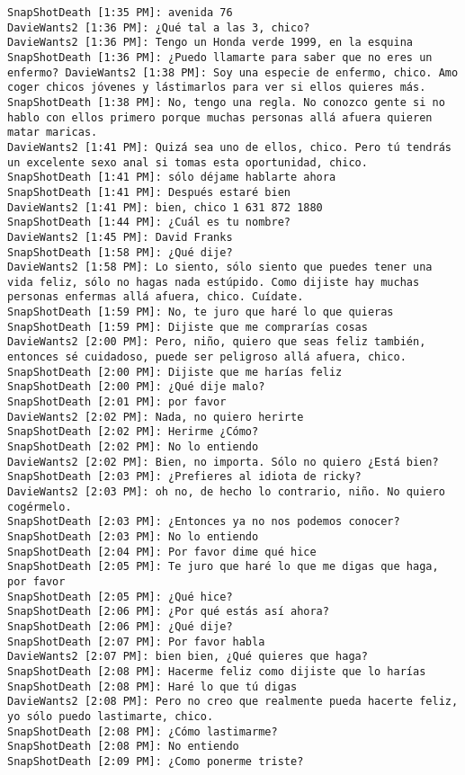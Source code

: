 \begin{verbatim}
SnapShotDeath [1:35 PM]: avenida 76
DavieWants2 [1:36 PM]: ¿Qué tal a las 3, chico? 
DavieWants2 [1:36 PM]: Tengo un Honda verde 1999, en la esquina 
SnapShotDeath [1:36 PM]: ¿Puedo llamarte para saber que no eres un enfermo? DavieWants2 [1:38 PM]: Soy una especie de enfermo, chico. Amo coger chicos jóvenes y lástimarlos para ver si ellos quieres más. 
SnapShotDeath [1:38 PM]: No, tengo una regla. No conozco gente si no hablo con ellos primero porque muchas personas allá afuera quieren matar maricas. 
DavieWants2 [1:41 PM]: Quizá sea uno de ellos, chico. Pero tú tendrás un excelente sexo anal si tomas esta oportunidad, chico. 
SnapShotDeath [1:41 PM]: sólo déjame hablarte ahora 
SnapShotDeath [1:41 PM]: Después estaré bien 
DavieWants2 [1:41 PM]: bien, chico 1 631 872 1880 
SnapShotDeath [1:44 PM]: ¿Cuál es tu nombre? 
DavieWants2 [1:45 PM]: David Franks 
SnapShotDeath [1:58 PM]: ¿Qué dije?
DavieWants2 [1:58 PM]: Lo siento, sólo siento que puedes tener una vida feliz, sólo no hagas nada estúpido. Como dijiste hay muchas personas enfermas allá afuera, chico. Cuídate. 
SnapShotDeath [1:59 PM]: No, te juro que haré lo que quieras 
SnapShotDeath [1:59 PM]: Dijiste que me comprarías cosas 
DavieWants2 [2:00 PM]: Pero, niño, quiero que seas feliz también, entonces sé cuidadoso, puede ser peligroso allá afuera, chico. 
SnapShotDeath [2:00 PM]: Dijiste que me harías feliz 
SnapShotDeath [2:00 PM]: ¿Qué dije malo? 
SnapShotDeath [2:01 PM]: por favor 
DavieWants2 [2:02 PM]: Nada, no quiero herirte 
SnapShotDeath [2:02 PM]: Herirme ¿Cómo? 
SnapShotDeath [2:02 PM]: No lo entiendo 
DavieWants2 [2:02 PM]: Bien, no importa. Sólo no quiero ¿Está bien? 
SnapShotDeath [2:03 PM]: ¿Prefieres al idiota de ricky? 
DavieWants2 [2:03 PM]: oh no, de hecho lo contrario, niño. No quiero cogérmelo. 
SnapShotDeath [2:03 PM]: ¿Entonces ya no nos podemos conocer? 
SnapShotDeath [2:03 PM]: No lo entiendo 
SnapShotDeath [2:04 PM]: Por favor dime qué hice 
SnapShotDeath [2:05 PM]: Te juro que haré lo que me digas que haga, por favor 
SnapShotDeath [2:05 PM]: ¿Qué hice? 
SnapShotDeath [2:06 PM]: ¿Por qué estás así ahora?
SnapShotDeath [2:06 PM]: ¿Qué dije? 
SnapShotDeath [2:07 PM]: Por favor habla 
DavieWants2 [2:07 PM]: bien bien, ¿Qué quieres que haga? 
SnapShotDeath [2:08 PM]: Hacerme feliz como dijiste que lo harías 
SnapShotDeath [2:08 PM]: Haré lo que tú digas 
DavieWants2 [2:08 PM]: Pero no creo que realmente pueda hacerte feliz, yo sólo puedo lastimarte, chico. 
SnapShotDeath [2:08 PM]: ¿Cómo lastimarme? 
SnapShotDeath [2:08 PM]: No entiendo 
SnapShotDeath [2:09 PM]: ¿Como ponerme triste? 

\end{verbatim}
